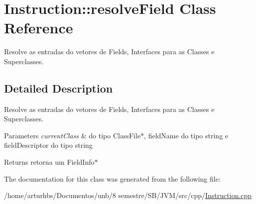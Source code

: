 \hypertarget{classInstruction_1_1resolveField}{}\section{Instruction\+:\+:resolve\+Field Class Reference}
\label{classInstruction_1_1resolveField}


Resolve as entradas do vetores de Fields, Interfaces para as Classes e Superclasses.  




\subsection{Detailed Description}
Resolve as entradas do vetores de Fields, Interfaces para as Classes e Superclasses. 


\begin{DoxyParams}{Parameters}
{\em current\+Class} & do tipo Class\+File$\ast$, field\+Name do tipo string e field\+Descriptor do tipo string \\
\hline
\end{DoxyParams}
\begin{DoxyReturn}{Returns}
retorna um Field\+Info$\ast$ 
\end{DoxyReturn}


The documentation for this class was generated from the following file\+:\begin{DoxyCompactItemize}
\item 
/home/arturhbs/\+Documentos/unb/8 semestre/\+S\+B/\+J\+V\+M/src/cpp/\hyperlink{Instruction_8cpp}{Instruction.\+cpp}\end{DoxyCompactItemize}

